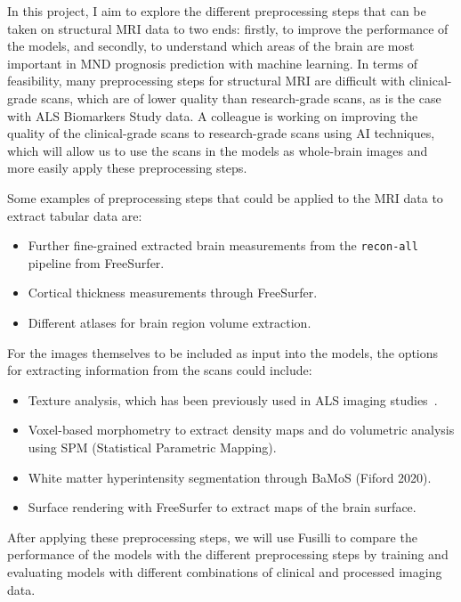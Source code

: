 In this project, I aim to explore the different preprocessing steps that can be taken on structural MRI data to two ends: firstly, to improve the performance of the models, and secondly, to understand which areas of the brain are most important in MND prognosis prediction with machine learning.
In terms of feasibility, many preprocessing steps for structural MRI are difficult with clinical-grade scans, which are of lower quality than research-grade scans, as is the case with ALS Biomarkers Study data.
A colleague is working on improving the quality of the clinical-grade scans to research-grade scans using AI techniques, which will allow us to use the scans in the models as whole-brain images and more easily apply these preprocessing steps.

Some examples of preprocessing steps that could be applied to the MRI data to extract tabular data are:
\begin{itemize}
\setlength\itemsep{-0.5em}
    \item Further fine-grained extracted brain measurements from the \texttt{recon-all} pipeline from FreeSurfer.
    \item Cortical thickness measurements through FreeSurfer.
    \item Different atlases for brain region volume extraction.
\end{itemize}

For the images themselves to be included as input into the models, the options for extracting information from the scans could include:
\begin{itemize}
\setlength\itemsep{-0.5em}
    \item Texture analysis, which has been previously used in ALS imaging studies~\cite{ishaqueEvaluatingCerebralCorrelates2018, johnsQuantifyingChangesSusceptibility2019}.
    \item Voxel-based morphometry to extract density maps and do volumetric analysis using SPM (Statistical Parametric Mapping).
    \item White matter hyperintensity segmentation through BaMoS (Fiford 2020).
    \item Surface rendering with FreeSurfer to extract maps of the brain surface.
\end{itemize}

After applying these preprocessing steps, we will use Fusilli to compare the performance of the models with the different preprocessing steps by training and evaluating models with different combinations of clinical and processed imaging data.

